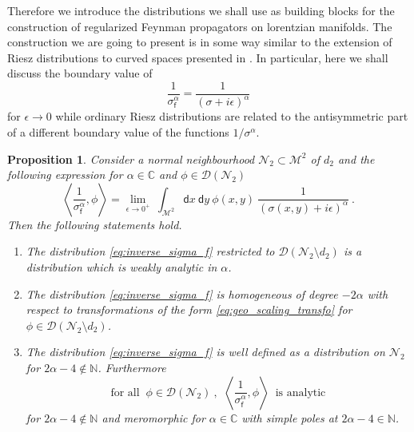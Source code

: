 \documentclass[11pt]{book}
\newcommand{\sm}[1]{\left\langle#1\right\rangle}
\newcommand{\Dcal}{\mathcal{D}}
\newcommand{\Mcal}{\mathcal{M}}
\newcommand{\Ncal}{\mathcal{N}}
\newcommand{\Cbb}{\mathbb{C}}
\newcommand{\Nbb}{\mathbb{N}}
\newcommand{\dsf}{\mathsf{d}}
\newcommand{\fsf}{\mathsf{f}}
\theoremstyle{break}
\newtheorem{proposition}{Proposition}
\begin{document}
Therefore we introduce the distributions we shall use as building blocks for the construction of regularized Feynman propagators on lorentzian manifolds. The construction we are going to present is in some way similar to the extension of Riesz distributions to curved spaces presented in \cite{baer_wave_2008}. In particular, here we shall discuss the boundary value of 
%
\begin{equation}
\frac{1}{\sigma_\fsf^\alpha} = \frac{1}{(\sigma+i\epsilon)^{\alpha}} 
\label{eq:inverse_sigma_f}
\end{equation}
%
for $\epsilon\to0$ while ordinary Riesz distributions are related to the antisymmetric part of a different boundary value of the functions $1/\sigma^\alpha$.


\begin{proposition}\label{prop:sigma_1}
Consider a normal neighbourhood $\Ncal_2 \subset\Mcal^2$ of $d_2$ and the following expression for $\alpha \in \Cbb$ and $\phi \in \Dcal(\Ncal_2)$
%
\begin{equation*}
\sm{ \frac{1}{\sigma^\alpha_\fsf} , \phi } = \lim_{\epsilon \to 0^+ } \ \int_{\Mcal^2} \dsf x \ \dsf y \ \phi(x,y) \ \frac{1}{(\sigma(x,y)+i\epsilon)^{\alpha}} \ .
\end{equation*}
%
Then the following statements hold.
%
\begin{enumerate}
%
\item The distribution \eqref{eq:inverse_sigma_f} restricted to $\Dcal(\Ncal_2 \setminus d_2)$ is a distribution which is weakly analytic in $\alpha$.
%
\item The distribution \eqref{eq:inverse_sigma_f} is homogeneous of degree $-2\alpha$ with respect to transformations of the form \eqref{eq:geo_scaling_transfo} for $\phi \in \Dcal(\Ncal_2\setminus d_2)$.
%
\item The distribution \eqref{eq:inverse_sigma_f} is well defined as a distribution on $\Ncal_2$ for $2\alpha-4 \notin \Nbb$. Furthermore
%
\begin{equation*}
\mbox{for all } \ \phi \in \Dcal(\Ncal_2) \ , \ \ \sm{ \frac{1}{\sigma^\alpha_\fsf} , \phi } \ \mbox{ is analytic}
\end{equation*}
%
for $2\alpha-4\notin \Nbb$ and meromorphic for $\alpha \in \Cbb$ with simple poles at $2\alpha-4\in \mathbb{N}$. 
%
\end{enumerate}
%
\end{proposition}
\end{document}
